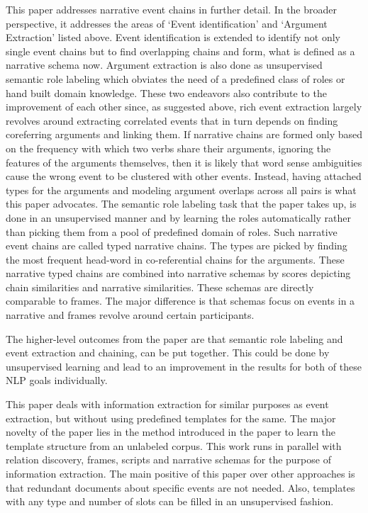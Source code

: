 This paper addresses narrative event chains in further detail. In the broader perspective, it addresses the areas of ‘Event identification’ and ‘Argument Extraction’ listed above.
Event identification is extended to identify not only single event chains but to find overlapping chains and form, what is defined as a narrative schema now. Argument extraction is also done as unsupervised semantic role labeling which obviates the need of a predefined class of roles or hand built domain knowledge. These two endeavors also contribute to the improvement of each other since, as suggested above, rich event extraction largely revolves around extracting correlated events that in turn depends on finding coreferring arguments and linking them. If narrative chains are formed only based on the frequency with which two verbs share their arguments, ignoring the features of the arguments themselves, then it is likely that word sense ambiguities cause the wrong event to be clustered with other events. Instead, having attached types for the arguments and modeling argument overlaps across all pairs is what this paper advocates. 
The semantic role labeling  task that the paper takes up, is done in an unsupervised manner and by learning the roles automatically rather than picking them from a pool of predefined domain of roles. Such narrative event chains are called typed narrative chains. The types are picked by finding the most frequent head-word in co-referential chains for the arguments. These narrative typed chains are combined into narrative schemas by scores depicting chain similarities and narrative similarities. These schemas are directly comparable to frames.
The major difference is that schemas focus on events in a narrative and frames revolve around certain participants.

The higher-level outcomes from the paper are that semantic role labeling and event extraction and chaining, can be put together. This could be done by unsupervised learning and lead to an improvement in the results for both of these NLP goals individually.


This paper deals with information extraction for similar purposes as event extraction, but without using predefined templates for the same. The major novelty of the paper lies in the method introduced in the paper to learn the template structure from an unlabeled corpus. This work runs in parallel with relation discovery, frames, scripts and narrative schemas for the purpose of information extraction. The main positive of this paper over other approaches is that redundant documents about specific events are not needed. Also, templates with any type and number of slots can be filled in an unsupervised fashion.

